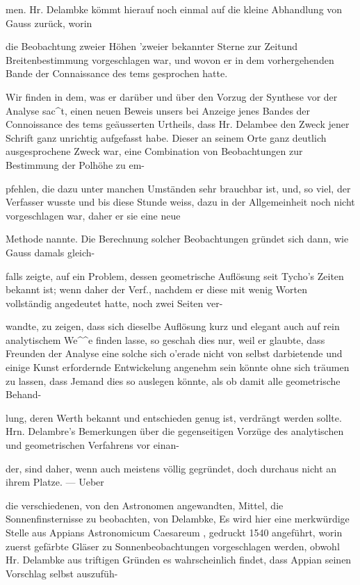 \documentclass[10pt,a4paper]{article}
\begin{document}
men. Hr. Delambke kömmt hierauf noch einmal auf die kleine Abhandlung von Gauss zurück, worin

die Beobachtung zweier Höhen 'zweier bekannter Sterne zur Zeitund Breitenbestimmung vorgeschlagen war, und wovon er in dem vorhergehenden Bande der Connaissance des tems gesprochen hatte.

Wir finden in dem, was er darüber und über den Vorzug der Synthese vor der Analyse sac\textasciicircum{}t, einen neuen Beweis unsers bei Anzeige jenes Bandes der Connoissance des tems geäusserten Urtheils, dass Hr. Delambee den Zweck jener Schrift ganz unrichtig aufgefasst habe. Dieser an seinem Orte ganz deutlich ausgesprochene Zweck war, eine Combination von Beobachtungen zur Bestimmung der Polhöhe zu em-

pfehlen, die dazu unter manchen Umständen sehr brauchbar ist, und, so viel, der Verfasser wusste und bis diese Stunde weiss, dazu in der Allgemeinheit noch nicht vorgeschlagen war, daher er sie eine neue

Methode nannte. Die Berechnung solcher Beobachtungen gründet sich dann, wie Gauss damals gleich-

falls zeigte, auf ein Problem, dessen geometrische Auflösung seit Tycho's Zeiten bekannt ist; wenn daher der Verf., nachdem er diese mit wenig Worten vollständig angedeutet hatte, noch zwei Seiten ver-

wandte, zu zeigen, dass sich dieselbe Auflösung kurz und elegant auch auf rein analytischem We\textasciicircum{}\textasciicircum{}e finden lasse, so geschah dies nur, weil er glaubte, dass Freunden der Analyse eine solche sich o'erade nicht von selbst darbietende und einige Kunst erfordernde Entwickelung angenehm sein könnte ohne sich träumen zu lassen, dass Jemand dies so auslegen könnte, als ob damit alle geometrische Behand-

lung, deren Werth bekannt und entschieden genug ist, verdrängt werden sollte. Hrn. Delambre's Bemerkungen über die gegenseitigen Vorzüge des analytischen und geometrischen Verfahrens vor einan-

der, sind daher, wenn auch meistens völlig gegründet, doch durchaus nicht an ihrem Platze. — Ueber

die verschiedenen, von den Astronomen angewandten, Mittel, die Sonnenfinsternisse zu beobachten, von Delambke, Es wird hier eine merkwürdige Stelle aus Appians Astronomicum Caesareum , gedruckt 1540 angeführt, worin zuerst gefärbte Gläser zu Sonnenbeobachtungen vorgeschlagen werden, obwohl Hr. Delambke aus triftigen Gründen es wahrscheinlich findet, dass Appian seinen Vorschlag selbst auszufüh-
\end{document}
